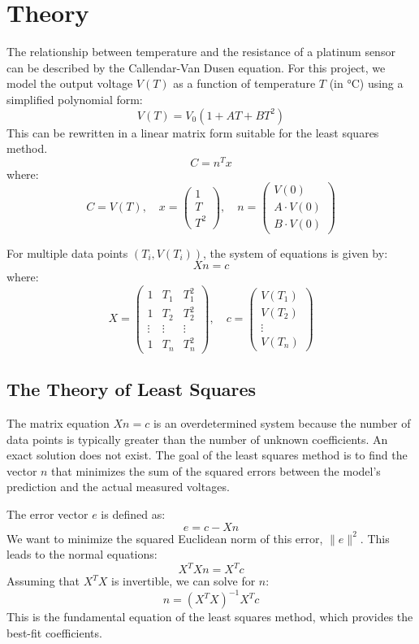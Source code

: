 \documentclass{article}
\begin{document}
	\section{Theory}
	The relationship between temperature and the resistance of a platinum sensor can be described by the Callendar-Van Dusen equation. For this project, we model the output voltage \(V(T)\) as a function of temperature \(T\) (in °C) using a simplified polynomial form:
	\[
	V(T) = V_0 \left(1 + AT + BT^2\right)
	\]
	This can be rewritten in a linear matrix form suitable for the least squares method.
	\[
	C = n^T x
	\]
	where:
	\[ C = V(T), \quad x = \begin{pmatrix} 1 \\ T \\ T^2 \end{pmatrix}, \quad n = \begin{pmatrix} V(0) \\ A \cdot V(0) \\ B \cdot V(0) \end{pmatrix} \]
	
	For multiple data points \((T_i, V(T_i))\), the system of equations is given by:
	\[ Xn = c \]
	where:
	\[ X = \begin{pmatrix} 1 & T_1 & T_1^2 \\ 1 & T_2 & T_2^2 \\ \vdots & \vdots & \vdots \\ 1 & T_n & T_n^2 \end{pmatrix}, \quad c = \begin{pmatrix} V(T_1) \\ V(T_2) \\ \vdots \\ V(T_n) \end{pmatrix} \]
	
	\subsection{The Theory of Least Squares}
	The matrix equation \(Xn = c\) is an overdetermined system because the number of data points is typically greater than the number of unknown coefficients. An exact solution does not exist. The goal of the least squares method is to find the vector \(n\) that minimizes the sum of the squared errors between the model's prediction and the actual measured voltages.
	
	The error vector \(e\) is defined as:
	\[ e = c - Xn \]
	We want to minimize the squared Euclidean norm of this error, \( \|e\|^2 \). This leads to the normal equations:
	\[ X^T X n = X^T c \]
	Assuming that \(X^T X\) is invertible, we can solve for \(n\):
	\[ n = (X^T X)^{-1} X^T c \]
	This is the fundamental equation of the least squares method, which provides the best-fit coefficients.
	
\end{document}
